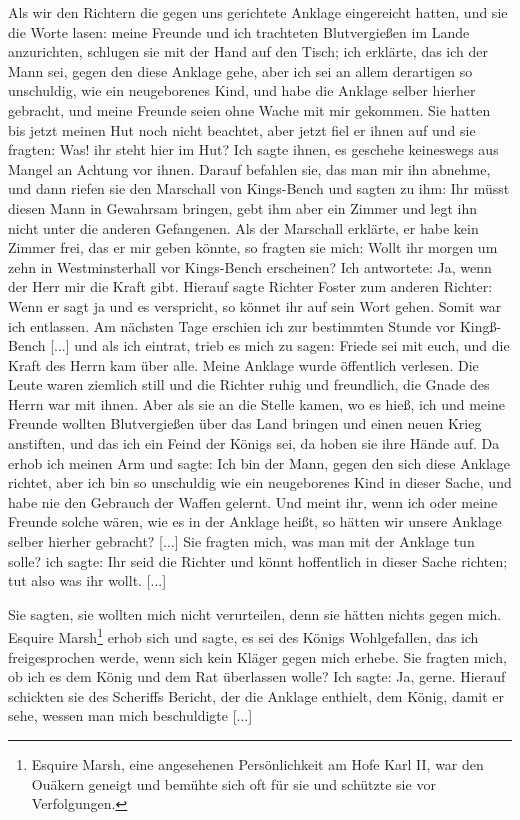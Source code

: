 Als wir den Richtern die gegen uns gerichtete Anklage eingereicht 
hatten, und sie die Worte lasen: meine Freunde und ich
trachteten Blutvergießen im Lande anzurichten, schlugen sie mit
der Hand auf den Tisch; ich erklärte, das ich der Mann sei,
gegen den diese Anklage gehe, aber ich sei an allem derartigen
so unschuldig, wie ein neugeborenes Kind, und habe die Anklage
selber hierher gebracht, und meine Freunde seien ohne Wache mit
mir gekommen. Sie hatten bis jetzt meinen Hut noch nicht
beachtet, aber jetzt fiel er ihnen auf und sie fragten: \glqq Was! ihr
steht hier im Hut?\grqq{} Ich sagte ihnen, es geschehe keineswegs
aus Mangel an Achtung vor ihnen. Darauf befahlen sie, das
man mir ihn abnehme, und dann riefen sie den Marschall von
Kings-Bench und sagten zu ihm: \glqq Ihr müsst diesen Mann in
Gewahrsam bringen, gebt ihm aber ein Zimmer und legt ihn nicht
unter die anderen Gefangenen.\grqq{} Als der Marschall erklärte, er
habe kein Zimmer frei, das er mir geben könnte, so fragten sie
mich: \glqq Wollt ihr morgen um zehn in Westminsterhall vor 
Kings-Bench erscheinen?\grqq{} Ich antwortete: \glqq Ja, wenn der Herr mir die
Kraft gibt.\grqq{} Hierauf sagte Richter Foster zum anderen Richter:
\glqq Wenn er sagt ja und es verspricht, so könnet ihr auf sein Wort
gehen.\grqq{} Somit war ich entlassen. Am nächsten Tage erschien
ich zur bestimmten Stunde vor Kingß-Bench [...] und als ich
eintrat, trieb es mich zu sagen: \glqq Friede sei mit euch,\grqq{} und die
Kraft des Herrn kam über alle. Meine Anklage wurde öffentlich
verlesen. Die Leute waren ziemlich still und die Richter ruhig
und freundlich, die Gnade des Herrn war mit ihnen. Aber als
sie an die Stelle kamen, wo es hieß, ich und meine Freunde
wollten Blutvergießen über das Land bringen und einen neuen
Krieg anstiften, und das ich ein Feind der Königs sei, da hoben
sie ihre Hände auf. Da erhob ich meinen Arm und sagte: \glqq Ich
bin der Mann, gegen den sich diese Anklage richtet, aber ich bin
so unschuldig wie ein neugeborenes Kind in dieser Sache, und
habe nie den Gebrauch der Waffen gelernt. Und meint ihr, wenn
ich oder meine Freunde solche wären, wie es in der Anklage
heißt, so hätten wir unsere Anklage selber hierher gebracht?\grqq{} [...]
Sie fragten mich, was man mit der Anklage tun solle? ich sagte:
\glqq Ihr seid die Richter und könnt hoffentlich in dieser Sache
richten; tut also was ihr wollt. [...]\grqq{}

Sie sagten, sie wollten mich nicht verurteilen, denn sie hätten
nichts gegen mich. Esquire Marsh\footnote{Esquire Marsh, eine 
angesehenen Persönlichkeit am Hofe Karl II, war den
Ouäkern geneigt und bemühte sich oft für sie und schützte sie vor 
Verfolgungen.} erhob sich und sagte, es sei
des Königs Wohlgefallen, das ich freigesprochen werde, wenn sich
kein Kläger gegen mich erhebe. Sie fragten mich, ob ich es dem
König und dem Rat überlassen wolle? Ich sagte: \glqq Ja, gerne.\grqq{}
Hierauf schickten sie des Scheriffs Bericht, der die Anklage enthielt,
dem König, damit er sehe, wessen man mich beschuldigte [...]

